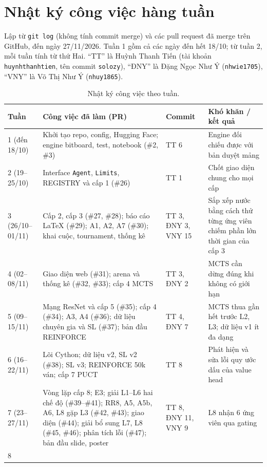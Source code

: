 \chapter{Nhật ký công việc hàng tuần}
\label{app:nhat-ky}

Lập từ \texttt{git log} (không tính commit merge) và các pull request đã merge trên GitHub, đến ngày 27/11/2026. Tuần 1 gồm cả các ngày đến hết 18/10; từ tuần 2, mỗi tuần tính từ thứ Hai. ``TT'' là Huỳnh Thanh Tiến (tài khoản \texttt{huynhthanhtien}, tên commit \texttt{solozy}), ``ĐNY'' là Đặng Ngọc Như Ý (\texttt{nhwie1705}), ``VNY'' là Võ Thị Như Ý (\texttt{nhuy1865}).

\begin{table}[H]
  \centering
  \footnotesize
  \begin{tabularx}{\textwidth}{p{2.1cm} >{\hsize=1.25\hsize\raggedright\arraybackslash}X p{2.5cm} >{\hsize=0.75\hsize\raggedright\arraybackslash}X}
    \toprule
    \textbf{Tuần} & \textbf{Công việc đã làm (PR)} & \textbf{Commit} & \textbf{Khó khăn / kết quả} \\
    \midrule
    1 (đến 18/10) & Khởi tạo repo, config, Hugging Face; engine bitboard, test, notebook (\#2, \#3) & TT 6 & Engine đối chiếu được với bản duyệt mảng \\
    2 (19--25/10) & Interface \texttt{Agent}, \texttt{Limits}, REGISTRY và cấp 1 (\#26) & TT 1 & Chốt giao diện chung cho mọi cấp \\
    3 (26/10--01/11) & Cấp 2, cấp 3 (\#27, \#28); báo cáo LaTeX (\#29); A1, A2, A7 (\#30); khai cuộc, tournament, thống kê & TT 3, ĐNY 3, VNY 15 & Sắp xếp nước bằng cách thử từng ứng viên chiếm phần lớn thời gian của cấp 3 \\
    4 (02--08/11) & Giao diện web (\#31); arena và thống kê (\#32, \#33); cấp 4 MCTS & TT 3, ĐNY 2 & MCTS cần dừng đúng khi không có giới hạn \\
    5 (09--15/11) & Mạng ResNet và cấp 5 (\#35); cấp 4 (\#34); A3, A4 (\#36); dữ liệu chuyên gia và SL (\#37); bản đầu REINFORCE & TT 4, ĐNY 7 & MCTS thua gần hết trước L2, L3; dữ liệu v1 ít đa dạng \\
    6 (16--22/11) & Lõi Cython; dữ liệu v2, SL v2 (\#38); SL v3; REINFORCE 50k ván; cấp 7 PUCT & TT 8 & Phát hiện và sửa lỗi quy ước dấu của value head \\
    7 (23--27/11) & Vòng lặp cấp 8; E3; giải L1--L6 hai chế độ (\#39--\#41); RR8, A5, A5b, A6, L8 gặp L3 (\#42, \#43); giao diện (\#44); giải bổ sung L7, L8 (\#45, \#46); phân tích lỗi (\#47); bản đầu slide, poster & TT 8, ĐNY 11, VNY 9 & L8 nhận 6 ứng viên qua gating \\
    8 & \multicolumn{3}{l}{Chưa diễn ra tại thời điểm lập nhật ký (27/11/2026)} \\
    \bottomrule
  \end{tabularx}
  \caption{Nhật ký công việc theo tuần.}
  \label{tab:nhat-ky-tuan}
\end{table}
